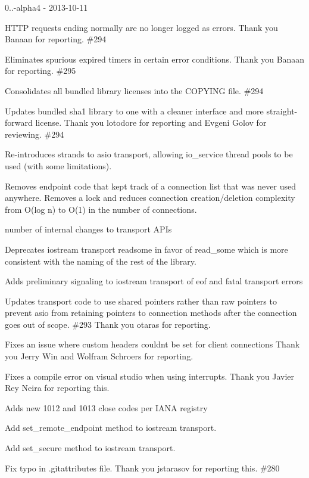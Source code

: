 0..-\/alpha4 -\/ 2013-\/10-\/11
\begin{DoxyItemize}
\item HTTP requests ending normally are no longer logged as errors. Thank you Banaan for reporting. \#294
\item Eliminates spurious expired timers in certain error conditions. Thank you Banaan for reporting. \#295
\item Consolidates all bundled library licenses into the COPYING file. \#294
\item Updates bundled sha1 library to one with a cleaner interface and more straight-\/forward license. Thank you lotodore for reporting and Evgeni Golov for reviewing. \#294
\item Re-\/introduces strands to asio transport, allowing {\ttfamily io\+\_\+service} thread pools to be used (with some limitations).
\item Removes endpoint code that kept track of a connection list that was never used anywhere. Removes a lock and reduces connection creation/deletion complexity from O(log n) to O(1) in the number of connections.
\item {} number of internal changes to transport APIs
\item Deprecates iostream transport {\ttfamily readsome} in favor of {\ttfamily read\+\_\+some} which is more consistent with the naming of the rest of the library.
\item Adds preliminary signaling to iostream transport of eof and fatal transport errors
\item Updates transport code to use shared pointers rather than raw pointers to prevent asio from retaining pointers to connection methods after the connection goes out of scope. \#293 Thank you otaras for reporting.
\item Fixes an issue where custom headers couldn\textquotesingle{}t be set for client connections Thank you Jerry Win and Wolfram Schroers for reporting.
\item Fixes a compile error on visual studio when using interrupts. Thank you Javier Rey Neira for reporting this.
\item Adds new 1012 and 1013 close codes per IANA registry
\item Add {\ttfamily set\+\_\+remote\+\_\+endpoint} method to iostream transport.
\item Add {\ttfamily set\+\_\+secure} method to iostream transport.
\item Fix typo in .gitattributes file. Thank you jstarasov for reporting this. \#280

\end{DoxyItemize}

